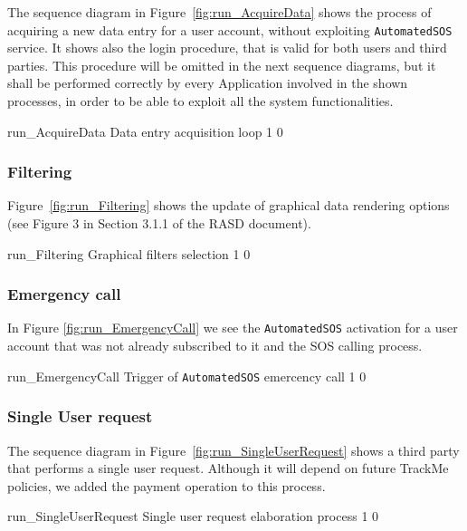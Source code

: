 \documentclass[../DD0.tex]{subfiles}
\begin{document}
      The sequence diagram in Figure~\ref{fig:run_AcquireData} shows the process of acquiring a new data entry for a user account, without exploiting \texttt{AutomatedSOS} service. It shows also the login procedure, that is valid for both users and third parties. This procedure will be omitted in the next sequence diagrams, but it shall be performed correctly by every Application involved in the shown processes, in order to be able to exploit all the system functionalities.

      \fetchUML
        {run_AcquireData}
        {Data entry acquisition loop}
        {1}           %
        {0}           %

    \clearpage
    \subsubsection{Filtering}
    \label{sec:filtering}

      Figure~\ref{fig:run_Filtering} shows the update of graphical data rendering options (see Figure 3 in Section 3.1.1 of the RASD document).

      \fetchUML
        {run_Filtering}
        {Graphical filters selection}
        {1}           %
        {0}           %

    \clearpage
    \subsubsection{Emergency call}
    \label{sec:automatedSOS}

      In Figure \ref{fig:run_EmergencyCall} we see the \texttt{AutomatedSOS} activation for a user account that was not already subscribed to it and the SOS calling process.

      \fetchUML
        {run_EmergencyCall}
        {Trigger of \texttt{AutomatedSOS} emercency call}
        {1}           %
        {0}           %

    \clearpage
    \subsubsection{Single User request}
    \label{sec:singleuser}

      The sequence diagram in Figure~\ref{fig:run_SingleUserRequest} shows a third party that performs a single user request. Although it will depend on future TrackMe policies, we added the payment operation to this process.

      \fetchUML
        {run_SingleUserRequest}
        {Single user request elaboration process}
        {1}           %
        {0}           %
\end{document}
